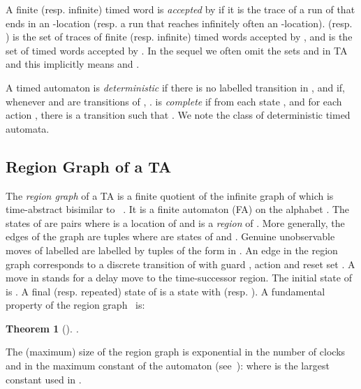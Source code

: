 \documentclass[letterpaper,10pt,conference]{ieeeconf}  \IEEEoverridecommandlockouts                              \overrideIEEEmargins
\def\st{{s.t.}~}
\newtheorem{theorem}{Theorem}
\begin{document}
A finite (resp. infinite) timed word  is \emph{accepted} by  if
it is the trace of a run of  that ends in an -location (resp. a
run that reaches infinitely often an -location).  
(resp. ) is the set of traces of finite
(resp. infinite) timed words accepted by , and  is the set of timed words accepted by .
In the sequel we often omit the sets  and  in TA and this
implicitly means  and .

A timed automaton  is \emph{deterministic} if there is no 
labelled transition in , and if, whenever  and
 are transitions of , .   is \emph{complete} if from each state , and
for each action , there is a transition  such
that .  We note \dta the class of deterministic timed
automata.


\iffalse
\medskip

A finite automaton (FA) is a particular TA with .
Consequently guards and invariants are vacuously true and time
elapsing transitions do not exist.  We write 
 for a FA.  A run is thus a
sequence of the form:

where for each , .
Definitions of traces and languages are straightforward.  In this
case, the duration of a run  is the number of steps
(including -steps) of : if  is finite and
ends in ,  and otherwise
.
\fi


\subsection{Region Graph of a TA}
The \emph{region graph}  of a TA  is a finite quotient of
the infinite graph of  which is time-abstract bisimilar to
~\cite{AlurDill94}.  It is a finite automaton (FA) on the alphabet
. The states of  are pairs 
where  is a location of  and  is a \emph{region} of
. More generally, the edges of the graph are tuples
 where  are states of  and .
Genuine unobservable moves of  labelled  are labelled by
tuples of the form  in .
An edge  in the region graph corresponds to a discrete
transition of  with guard , action  and reset set .
A  move in  stands for a delay move to the
time-successor region.  The initial state of  is
.  A final (resp. repeated) state of  is a
state  with  (resp. ).  A
fundamental property of the region graph~\cite{AlurDill94} is:
\begin{theorem}[\cite{AlurDill94}] \label{thm-alur}
  . 
\end{theorem}
\iffalse
In other words:
  \begin{enumerate}
  \item if  is accepted by , then there is a timed word 
    with  \st  is accepted by .
  \item if  is accepted by , then  is accepted
    .
  \end{enumerate}
\fi
  The (maximum) size of the region graph is exponential in the number
  of clocks and in the maximum constant of the automaton 
  (see~\cite{AlurDill94}):  where  is the largest constant used in .
\end{document}
